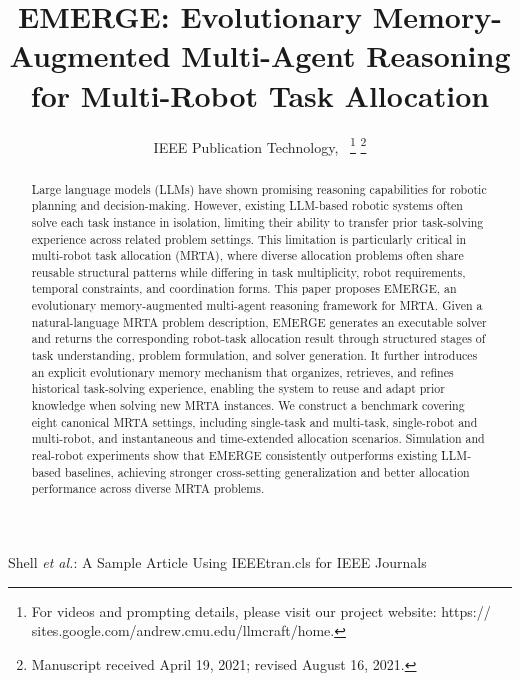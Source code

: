 \documentclass[letterpaper,journal]{IEEEtran}
\begin{document}
\title{EMERGE: Evolutionary Memory-Augmented Multi-Agent Reasoning for Multi-Robot Task Allocation}

\author{IEEE Publication Technology,~
\thanks{For videos and prompting details, please visit our project website: https://
sites.google.com/andrew.cmu.edu/llmcraft/home.}%
\thanks{Manuscript received April 19, 2021; revised August 16, 2021.}}

%
{Shell \MakeLowercase{\textit{et al.}}: A Sample Article Using IEEEtran.cls for IEEE Journals}


\maketitle

\begin{abstract}
Large language models (LLMs) have shown promising reasoning capabilities for robotic planning and decision-making. However, existing LLM-based robotic systems often solve each task instance in isolation, limiting their ability to transfer prior task-solving experience across related problem settings. This limitation is particularly critical in multi-robot task allocation (MRTA), where diverse allocation problems often share reusable structural patterns while differing in task multiplicity, robot requirements, temporal constraints, and coordination forms. This paper proposes EMERGE, an evolutionary memory-augmented multi-agent reasoning framework for MRTA. Given a natural-language MRTA problem description, EMERGE generates an executable solver and returns the corresponding robot-task allocation result through structured stages of task understanding, problem formulation, and solver generation. It further introduces an explicit evolutionary memory mechanism that organizes, retrieves, and refines historical task-solving experience, enabling the system to reuse and adapt prior knowledge when solving new MRTA instances. We construct a benchmark covering eight canonical MRTA settings, including single-task and multi-task, single-robot and multi-robot, and instantaneous and time-extended allocation scenarios. Simulation and real-robot experiments show that EMERGE consistently outperforms existing LLM-based baselines, achieving stronger cross-setting generalization and better allocation performance across diverse MRTA problems.

\end{abstract}
\end{document}
